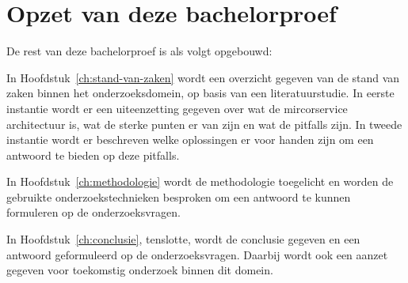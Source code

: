 \section{Opzet van deze bachelorproef}
\label{sec:opzet-bachelorproef}


De rest van deze bachelorproef is als volgt opgebouwd:

In Hoofdstuk~\ref{ch:stand-van-zaken} wordt een overzicht gegeven van de stand van zaken binnen het onderzoeksdomein, op basis van een literatuurstudie. In eerste instantie wordt er een uiteenzetting gegeven over wat de mircorservice architectuur is, wat de sterke punten er van zijn en wat de pitfalls zijn. In tweede instantie wordt er beschreven welke oplossingen er voor handen zijn om een antwoord te bieden op deze pitfalls.

In Hoofdstuk~\ref{ch:methodologie} wordt de methodologie toegelicht en worden de gebruikte onderzoekstechnieken besproken om een antwoord te kunnen formuleren op de onderzoeksvragen.


In Hoofdstuk~\ref{ch:conclusie}, tenslotte, wordt de conclusie gegeven en een antwoord geformuleerd op de onderzoeksvragen. Daarbij wordt ook een aanzet gegeven voor toekomstig onderzoek binnen dit domein.

